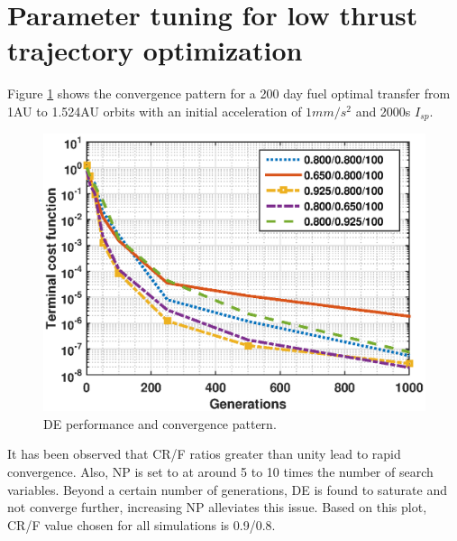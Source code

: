 \section{Parameter tuning for low thrust trajectory optimization}
Figure \ref{DE_params} shows  the convergence pattern for a 200 day fuel optimal transfer from 1AU to 1.524AU orbits with an initial acceleration of $1mm/s^2$ and 2000s $I_{sp}$.
\begin{figure}[H]
	\centering\includegraphics[width=0.90\linewidth]{DE_convgc_new.eps}
	\caption{DE performance and convergence pattern.}
	\label{DE_params}
\end{figure}
It has been observed that CR/F ratios greater than unity lead to rapid convergence. Also, NP is set to at around 5 to 10 times the number of search variables. Beyond a certain number of generations, DE is found to saturate and not converge further, increasing NP alleviates this issue. Based on this plot, CR/F value chosen for all simulations is 0.9/0.8.  